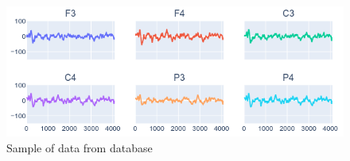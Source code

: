 \begin{frame}[allowframebreaks]
	\begin{figure}
		\centering
		\includegraphics[width=\linewidth]{images/dataBaseSample}
		\caption{Sample of data from database}
		\label{fig:databasesample}
	\end{figure}
\end{frame}

